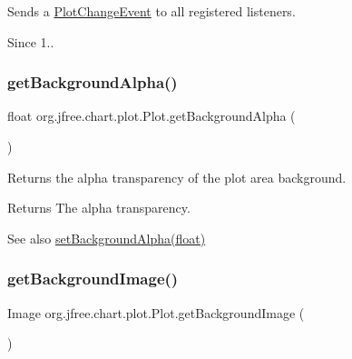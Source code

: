 Sends a \mbox{\hyperlink{}{Plot\+Change\+Event}} to all registered listeners.

\begin{DoxySince}{Since}
1.. 
\end{DoxySince}
\mbox{\label{classorg_1_1jfree_1_1chart_1_1plot_1_1_plot_ad9d25c2b8b15314bf48b6bbb8be98bc0}} 
\subsubsection{\texorpdfstring{get\+Background\+Alpha()}{getBackgroundAlpha()}}
{\footnotesize\ttfamily float org.\+jfree.\+chart.\+plot.\+Plot.\+get\+Background\+Alpha (\begin{DoxyParamCaption}{ }\end{DoxyParamCaption})}

Returns the alpha transparency of the plot area background.

\begin{DoxyReturn}{Returns}
The alpha transparency.
\end{DoxyReturn}
\begin{DoxySeeAlso}{See also}
\mbox{\hyperlink{classorg_1_1jfree_1_1chart_1_1plot_1_1_plot_a3af5eaa2997e7c1f88c87178e5cb41e4}{set\+Background\+Alpha(float)}} 
\end{DoxySeeAlso}
\mbox{\label{classorg_1_1jfree_1_1chart_1_1plot_1_1_plot_a22e81fa28885106c5cdc5d6411305c76}} 
\subsubsection{\texorpdfstring{get\+Background\+Image()}{getBackgroundImage()}}
{\footnotesize\ttfamily Image org.\+jfree.\+chart.\+plot.\+Plot.\+get\+Background\+Image (\begin{DoxyParamCaption}{ }\end{DoxyParamCaption})}


